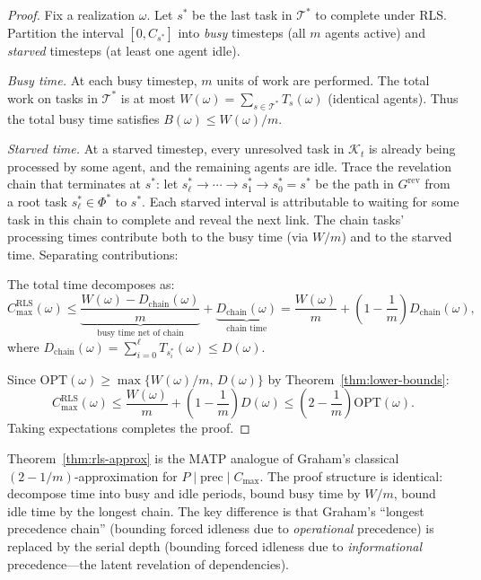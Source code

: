\begin{proof}
Fix a realization $\omega$. Let $s^*$ be the last task in $\mathcal{T}^*$ to complete under RLS. Partition the interval $[0, C_{s^*}]$ into \emph{busy} timesteps (all $m$ agents active) and \emph{starved} timesteps (at least one agent idle).

\emph{Busy time.} At each busy timestep, $m$ units of work are performed. The total work on tasks in $\mathcal{T}^*$ is at most $W(\omega) = \sum_{s\in\mathcal{T}^*} T_s(\omega)$ (identical agents). Thus the total busy time satisfies $B(\omega) \le W(\omega)/m$.

\emph{Starved time.} At a starved timestep, every unresolved task in $\mathcal{K}_t$ is already being processed by some agent, and the remaining agents are idle. Trace the revelation chain that terminates at $s^*$: let $s^*_\ell \to \cdots \to s^*_1 \to s^*_0 = s^*$ be the path in $G^{\mathrm{rev}}$ from a root task $s^*_\ell\in\Phi^*$ to $s^*$. Each starved interval is attributable to waiting for some task in this chain to complete and reveal the next link. The chain tasks' processing times contribute both to the busy time (via $W/m$) and to the starved time. Separating contributions:

The total time decomposes as:
\[
C_{\max}^{\mathrm{RLS}}(\omega) \le \underbrace{\frac{W(\omega) - D_{\mathrm{chain}}(\omega)}{m}}_{\text{busy time net of chain}} + \underbrace{D_{\mathrm{chain}}(\omega)}_{\text{chain time}} = \frac{W(\omega)}{m} + \left(1-\frac{1}{m}\right)D_{\mathrm{chain}}(\omega),
\]
where $D_{\mathrm{chain}}(\omega) = \sum_{i=0}^\ell T_{s^*_i}(\omega) \le D(\omega)$.

Since $\mathrm{OPT}(\omega) \ge \max\{W(\omega)/m,\, D(\omega)\}$ by Theorem~\ref{thm:lower-bounds}:
\[
C_{\max}^{\mathrm{RLS}}(\omega) \le \frac{W(\omega)}{m} + \left(1-\frac{1}{m}\right)D(\omega) \le \left(2-\frac{1}{m}\right)\mathrm{OPT}(\omega).
\]
Taking expectations completes the proof.
\end{proof}

\begin{remark}
Theorem~\ref{thm:rls-approx} is the MATP analogue of Graham's classical $(2-1/m)$-approximation for $P\mid\mathrm{prec}\mid C_{\max}$. The proof structure is identical: decompose time into busy and idle periods, bound busy time by $W/m$, bound idle time by the longest chain. The key difference is that Graham's ``longest precedence chain'' (bounding forced idleness due to \emph{operational} precedence) is replaced by the serial depth (bounding forced idleness due to \emph{informational} precedence---the latent revelation of dependencies).
\end{remark}


